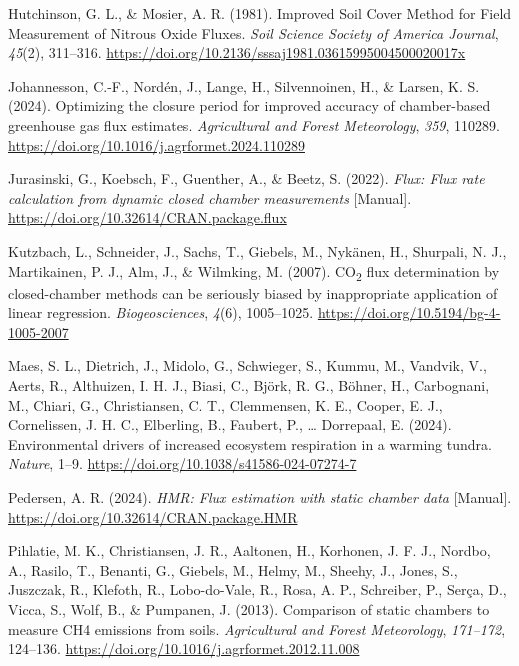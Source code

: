 \documentclass[
  letterpaper,
  DIV=11,
  numbers=noendperiod]{scrartcl}
\newlength{\cslhangindent}
\newenvironment{CSLReferences}[2] %
 {\begin{list}{}{%
  \setlength{\itemindent}{0pt}
  \setlength{\leftmargin}{0pt}
  \setlength{\parsep}{0pt}
  \ifodd #1
   \setlength{\leftmargin}{\cslhangindent}
   \setlength{\itemindent}{-1\cslhangindent}
  \fi
  \setlength{\itemsep}{#2\baselineskip}}}
 {\end{list}}
\begin{document}
\begin{CSLReferences}{1}{0}
Hutchinson, G. L., \& Mosier, A. R. (1981). Improved {Soil Cover Method}
for {Field Measurement} of {Nitrous Oxide Fluxes}. \emph{Soil Science
Society of America Journal}, \emph{45}(2), 311--316.
\url{https://doi.org/10.2136/sssaj1981.03615995004500020017x}

Johannesson, C.-F., Nordén, J., Lange, H., Silvennoinen, H., \& Larsen,
K. S. (2024). Optimizing the closure period for improved accuracy of
chamber-based greenhouse gas flux estimates. \emph{Agricultural and
Forest Meteorology}, \emph{359}, 110289.
\url{https://doi.org/10.1016/j.agrformet.2024.110289}

Jurasinski, G., Koebsch, F., Guenther, A., \& Beetz, S. (2022).
\emph{Flux: {Flux} rate calculation from dynamic closed chamber
measurements} {[}Manual{]}.
\url{https://doi.org/10.32614/CRAN.package.flux}

Kutzbach, L., Schneider, J., Sachs, T., Giebels, M., Nykänen, H.,
Shurpali, N. J., Martikainen, P. J., Alm, J., \& Wilmking, M. (2007).
{CO}{\textsubscript{2}} flux determination by closed-chamber methods can
be seriously biased by inappropriate application of linear regression.
\emph{Biogeosciences}, \emph{4}(6), 1005--1025.
\url{https://doi.org/10.5194/bg-4-1005-2007}

Maes, S. L., Dietrich, J., Midolo, G., Schwieger, S., Kummu, M.,
Vandvik, V., Aerts, R., Althuizen, I. H. J., Biasi, C., Björk, R. G.,
Böhner, H., Carbognani, M., Chiari, G., Christiansen, C. T., Clemmensen,
K. E., Cooper, E. J., Cornelissen, J. H. C., Elberling, B., Faubert, P.,
\ldots{} Dorrepaal, E. (2024). Environmental drivers of increased
ecosystem respiration in a warming tundra. \emph{Nature}, 1--9.
\url{https://doi.org/10.1038/s41586-024-07274-7}

Pedersen, A. R. (2024). \emph{{HMR}: {Flux} estimation with static
chamber data} {[}Manual{]}.
\url{https://doi.org/10.32614/CRAN.package.HMR}

Pihlatie, M. K., Christiansen, J. R., Aaltonen, H., Korhonen, J. F. J.,
Nordbo, A., Rasilo, T., Benanti, G., Giebels, M., Helmy, M., Sheehy, J.,
Jones, S., Juszczak, R., Klefoth, R., Lobo-do-Vale, R., Rosa, A. P.,
Schreiber, P., Serça, D., Vicca, S., Wolf, B., \& Pumpanen, J. (2013).
Comparison of static chambers to measure {CH4} emissions from soils.
\emph{Agricultural and Forest Meteorology}, \emph{171--172}, 124--136.
\url{https://doi.org/10.1016/j.agrformet.2012.11.008}


\end{CSLReferences}
\end{document}
